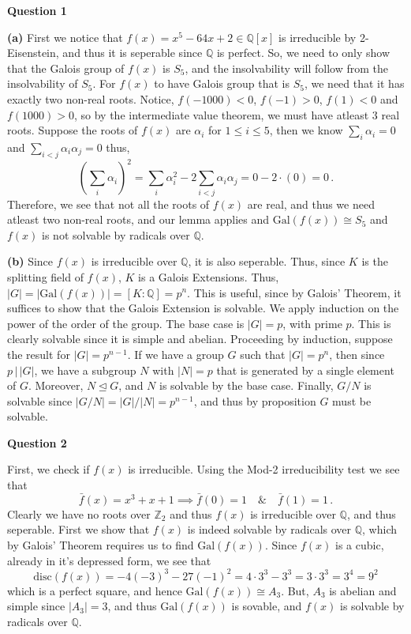 \documentclass[10pt]{article}
\newcommand{\Z}{\mathbb{Z}}
\newcommand{\Q}{\mathbb{Q}}
\newcommand{\Gal}{\text{Gal}}
\begin{document}
\textbf{Question 1}

\textbf{(a)} First we notice that $f(x) = x^{5} -64x + 2 \in \Q[x]$ is irreducible by 2-Eisenstein, and thus it is seperable since $\Q$ is perfect. So, we need to only show that the Galois group of $f(x)$ is $S_{5}$, and the insolvability will follow from the insolvability of $S_{5}$. For $f(x)$ to have Galois group that is $S_{5}$, we need that it has exactly two non-real roots. Notice, $f(-1000) < 0$, $f(-1) > 0$, $f(1) < 0$ and $f(1000) > 0$, so by the intermediate value theorem, we must have atleast 3 real roots. Suppose the roots of $f(x)$ are $\alpha_{i}$ for $1\leq i\leq 5$, then we know $\sum_{i} \alpha_{i} = 0$ and $\sum_{i < j} \alpha_{i}\alpha_{j} = 0$ thus,
\[(\sum_{i}\alpha_{i})^{2} = \sum_{i}\alpha_{i}^{2} - 2\sum_{i < j}\alpha_{i}\alpha_{j} = 0 - 2\cdot (0) = 0 \, .\]
Therefore, we see that not all the roots of $f(x)$ are real, and thus we need atleast two non-real roots, and our lemma applies and $\Gal(f(x)) \cong S_{5}$ and $f(x)$ is not solvable by radicals over $\Q$.

\textbf{(b)} Since $f(x)$ is irreducible over $\Q$, it is also seperable. Thus, since $K$ is the splitting field of $f(x)$, $K$ is a Galois Extensions. Thus, $|G| = |\Gal(f(x))| = [K:\Q] = p^{n}$. This is useful, since by Galois' Theorem, it suffices to show that the Galois Extension is solvable. We apply induction on the power of the order of the group. The base case is $|G| = p$, with prime $p$. This is clearly solvable since it is simple and abelian. Proceeding by induction, suppose the result for $|G| = p^{n-1}$. If we have a group $G$ such that $|G| = p^{n}$, then since $p\, |\, |G|$, we have a subgroup $N$ with $|N| = p$ that is generated by a single element of $G$. Moreover, $N \trianglelefteq G$, and $N$ is solvable by the base case. Finally, $G/N$ is solvable since $|G/N| = |G|/|N| = p^{n-1}$, and thus by proposition $G$ must be solvable.

\newpage
\textbf{Question 2}

First, we check if $f(x)$ is irreducible. Using the Mod-2 irreducibility test we see that
\[ \bar{f}(x) = x^{3} + x + 1 \implies \bar{f}(0) = 1 \quad \& \quad \bar{f}(1) = 1 \, .\]
Clearly we have no roots over $\Z_{2}$ and thus $f(x)$ is irreducible over $\Q$, and thus seperable. First we show that $f(x)$ is indeed solvable by radicals over $\Q$, which by Galois' Theorem requires us to find $\Gal(f(x))$. Since $f(x)$ is a cubic, already in it's depressed form, we see that
\[ \text{disc}(f(x)) = -4(-3)^{3} - 27(-1)^{2} = 4\cdot 3^3 - 3^{3} = 3\cdot 3^{3} = 3^{4} = 9^{2} \]
which is a perfect square, and hence $\Gal(f(x)) \cong A_{3}$. But, $A_{3}$ is abelian and simple since $|A_{3}| = 3$, and thus $\Gal(f(x))$ is sovable, and $f(x)$ is solvable by radicals over $\Q$.
\end{document}
